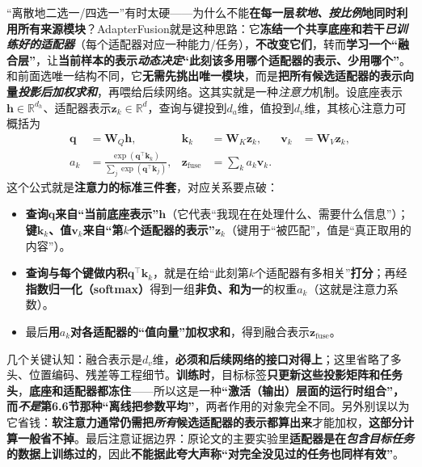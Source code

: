 “离散地二选一/四选一”有时太硬——为什么不能\textbf{在每一层\emph{软地、按比例}地同时利用所有来源模块}？AdapterFusion就是这种思路：它\textbf{冻结一个共享底座和若干\emph{已训练好的适配器}}（每个适配器对应一种能力/任务），\textbf{不改变它们}，转而\textbf{学习一个“融合层”}，让\textbf{当前样本的表示\emph{动态决定}“此刻该多用哪个适配器的表示、少用哪个”}。和前面选唯一结构不同，它\textbf{无需先挑出唯一模块}，而是\textbf{把所有候选适配器的表示向量\emph{投影后加权求和}}，再喂给后续网络。这其实就是一种\emph{注意力}机制。设底座表示$\bm{h}\in\mathbb{R}^{d_h}$、适配器表示$\bm{z}_k\in\mathbb{R}^{d}$，查询与键投到$d_a$维，值投到$d_v$维，其核心注意力可概括为
\begin{equation}
  \begin{aligned}
    \bm{q}&=\bm{W}_{Q}\bm{h},&
    \bm{k}_k&=\bm{W}_{K}\bm{z}_k,&
    \bm{v}_k&=\bm{W}_{V}\bm{z}_k,\\
    a_k&=\frac{\exp(\bm{q}^{\top}\bm{k}_k)}
                  {\sum_j\exp(\bm{q}^{\top}\bm{k}_j)},&
    \bm{z}_{\mathrm{fuse}}&=\sum_k a_k\bm{v}_k.
  \end{aligned}
  \label{eq:ket-integration-adapter-attention}
\end{equation}
这个公式就是\textbf{注意力的标准三件套}，对应关系要点破：
\begin{itemize}\item \textbf{查询$\bm{q}$来自“当前底座表示”}$\bm{h}$（它代表“我现在在处理什么、需要什么信息”）；\textbf{键$\bm{k}_k$、值$\bm{v}_k$来自“第$k$个适配器的表示”}$\bm{z}_k$（键用于“被匹配”，值是“真正取用的内容”）。\item \textbf{查询与每个键做内积}$\bm{q}^{\top}\bm{k}_k$，就是在给“此刻第$k$个适配器有多相关”\textbf{打分}；再经\textbf{指数归一化（softmax）}得到一组\textbf{非负、和为一}的权重$a_k$（这就是注意力系数）。\item 最后\textbf{用$a_k$对各适配器的“值向量”加权求和}，得到融合表示$\bm{z}_{\mathrm{fuse}}$。\end{itemize}
几个关键认知：融合表示是$d_v$维，\textbf{必须和后续网络的接口对得上}；这里省略了多头、位置编码、残差等工程细节。\textbf{训练时}，目标标签\textbf{只更新这些投影矩阵和任务头}，\textbf{底座和适配器都冻住}——所以这是一种\textbf{“激活（输出）层面的运行时组合”，而\emph{不是}第6.6节那种“离线把参数平均”}，两者作用的对象完全不同。另外别误以为它省钱：\textbf{软注意力通常仍需把\emph{所有}候选适配器的表示都算出来}才能加权，\textbf{这部分计算一般省不掉}。最后注意证据边界：原论文的主要实验里\textbf{适配器是在\emph{包含目标任务}的数据上训练过的}，因此\textbf{不能据此夸大声称“对完全没见过的任务也同样有效”}。

